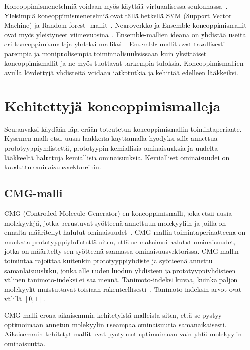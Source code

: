 \documentclass[finnish,twoside,censored,tkt,sw-line]{HYthesisML}
\begin{document}
Koneoppimismenetelmiä voidaan myös käyttää virtuaalisessa seulonnassa~\cite{SotrifferChristoph2011VSPC}.
Yleisimpiä koneoppimismenetelmiä ovat tällä hetkellä SVM (Support Vector Machine) ja Random forest -mallit~\cite{SotrifferChristoph2011VSPC}.
Neuroverkko ja Ensemble-koneoppimismallit ovat myös yleistyneet viimevuosina~\cite{ShinBonggun,PopovaMariya2018Drlf}.
Ensemble-mallien ideana on yhdistää useita eri koneoppimismalleja yhdeksi malliksi~\cite{RokachLior2009Ec}.
Ensemble-mallit ovat tavallisesti parempia ja monipuolisempia toiminnalisuuksissaan kuin yksittäiset koneoppimismallit ja ne myös tuottavat tarkempia tuloksia.
Koneoppimismallien avulla löydettyjä yhdisteitä voidaan jatkotutkia ja kehittää edelleen lääkkeiksi.

\section{Kehitettyjä koneoppimismalleja}

Seuraavaksi käydään läpi erään toteutetun koneoppimismallin toimintaperiaate.
Kyseinen malli etsii uusia lääkkeitä käyttämällä hyödyksi sille annettua prototyyppiyhdistettä, prototyypin kemiallisia ominaisuuksia ja uudelta lääkkeeltä haluttuja kemiallisia ominaisuuksia.
Kemialliset ominaisuudet on koodattu ominaisuusvektoreihin.

\subsection{CMG-malli}

CMG (Controlled Molecule Generator) on koneoppimismalli, joka etsii uusia molekyylejä, jotka perustuvat syötteenä annettuun molekyyliin ja joilla on ennalta määritellyt halutut ominaisuudet~\cite{ShinBonggun}.
CMG-mallin toimintaperiaatteena on muokata prototyyppiyhdistettä siten, että se maksimoi halutut ominaisuudet, jotka on määritelty sen syötteenä saamassa ominaisuusvektorissa.
CMG-mallin toimintaa rajoittaa kuitenkin prototyyppiyhdiste ja syötteenä annettu samanlaisuusluku, jonka alle uuden luodun yhdisteen ja prototyyppiyhdisteen välinen tanimoto-indeksi ei saa mennä.
Tanimoto-indeksi kuvaa, kuinka paljon molekyylit muistuttavat toisiaan rakenteellisesti~\cite{MaggioraGerald2014Msim}.
Tanimoto-indeksin arvot ovat välillä \([0,1]\).

CMG-malli eroaa aikaisemmin kehitetyistä malleista siten, että se pystyy optimoimaan annetun molekyylin useampaa ominaisuutta samanaikaisesti.
Aikaisemmin kehitetyt mallit ovat pystyneet optimoimaan vain yhtä molekyylin ominaisuutta.
\end{document}
